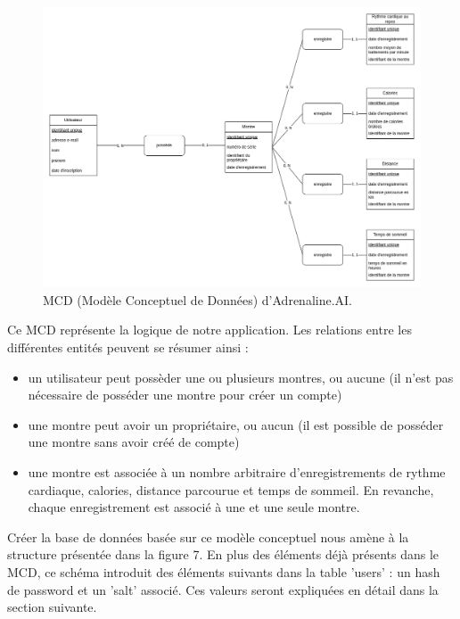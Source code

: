 \documentclass[french]{article}
\begin{document}
    \begin{figure}[h!]
        \includegraphics[width=12cm]{mcd_e4}
        \centering
        \caption{MCD (Modèle Conceptuel de Données) d'Adrenaline.AI.}
        \centering
    \end{figure}

    Ce MCD représente la logique de notre application. Les relations entre les différentes entités peuvent se résumer ainsi :
    \begin{itemize}
        \item un utilisateur peut possèder une ou plusieurs montres, ou aucune (il n'est pas nécessaire de posséder une montre pour créer un compte)
        \item une montre peut avoir un propriétaire, ou aucun (il est possible de posséder une montre sans avoir créé de compte)
        \item une montre est associée à un nombre arbitraire d'enregistrements de rythme cardiaque, calories, distance parcourue et temps de sommeil. En revanche, chaque enregistrement est associé à une et une seule montre.
    \end{itemize}

    Créer la base de données basée sur ce modèle conceptuel nous amène à la structure présentée dans la figure 7. En plus des éléments déjà présents dans le MCD, ce schéma introduit des éléments suivants dans la table 'users' : un hash de password et un 'salt' associé. Ces valeurs seront expliquées en détail dans la section suivante. 
\end{document}

